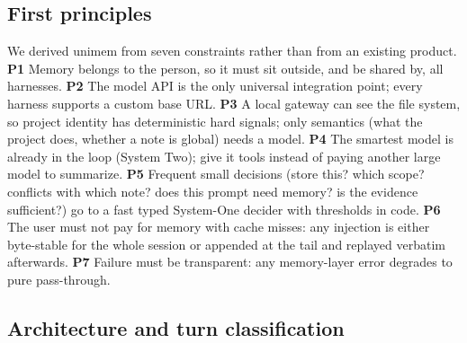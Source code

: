 \documentclass[10pt,twocolumn]{article}
\newcommand{\sys}{\textsf{unimem}}
\begin{document}
\subsection{First principles}
\label{sec:principles}
We derived \sys{} from seven constraints rather than from an existing product.
\textbf{P1} Memory belongs to the person, so it must sit outside, and be shared by, all harnesses.
\textbf{P2} The model API is the only universal integration point; every harness supports a custom base URL.
\textbf{P3} A local gateway can see the file system, so project identity has deterministic hard signals; only
semantics (what the project does, whether a note is global) needs a model.
\textbf{P4} The smartest model is already in the loop (System Two); give it tools instead of paying another large
model to summarize.
\textbf{P5} Frequent small decisions (store this? which scope? conflicts with which note? does this prompt need
memory? is the evidence sufficient?) go to a fast typed System-One decider with thresholds in code.
\textbf{P6} The user must not pay for memory with cache misses: any injection is either byte-stable for the whole
session or appended at the tail and replayed verbatim afterwards.
\textbf{P7} Failure must be transparent: any memory-layer error degrades to pure pass-through.

\subsection{Architecture and turn classification}
\label{sec:arch}
\end{document}
